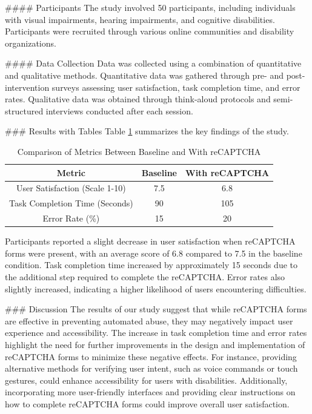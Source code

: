 #### Participants
The study involved 50 participants, including individuals with visual impairments, hearing impairments, and cognitive disabilities. Participants were recruited through various online communities and disability organizations.

#### Data Collection
Data was collected using a combination of quantitative and qualitative methods. Quantitative data was gathered through pre- and post-intervention surveys assessing user satisfaction, task completion time, and error rates. Qualitative data was obtained through think-aloud protocols and semi-structured interviews conducted after each session.

### Results with Tables
Table \ref{tab:results} summarizes the key findings of the study.

\begin{table}[ht]
\centering
\begin{tabular}{|c|c|c|}
\hline
\textbf{Metric} & \textbf{Baseline} & \textbf{With reCAPTCHA} \\
\hline
User Satisfaction (Scale 1-10) & 7.5 & 6.8 \\
\hline
Task Completion Time (Seconds) & 90 & 105 \\
\hline
Error Rate (\%) & 15 & 20 \\
\hline
\end{tabular}
\caption{Comparison of Metrics Between Baseline and With reCAPTCHA}
\label{tab:results}
\end{table}

Participants reported a slight decrease in user satisfaction when reCAPTCHA forms were present, with an average score of 6.8 compared to 7.5 in the baseline condition. Task completion time increased by approximately 15 seconds due to the additional step required to complete the reCAPTCHA. Error rates also slightly increased, indicating a higher likelihood of users encountering difficulties.

### Discussion
The results of our study suggest that while reCAPTCHA forms are effective in preventing automated abuse, they may negatively impact user experience and accessibility. The increase in task completion time and error rates highlight the need for further improvements in the design and implementation of reCAPTCHA forms to minimize these negative effects. For instance, providing alternative methods for verifying user intent, such as voice commands or touch gestures, could enhance accessibility for users with disabilities. Additionally, incorporating more user-friendly interfaces and providing clear instructions on how to complete reCAPTCHA forms could improve overall user satisfaction.


